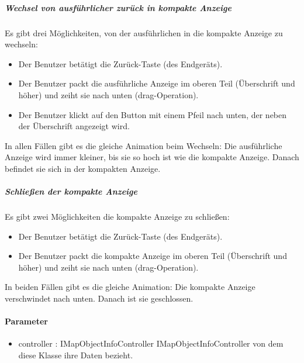 \subparagraph*{Wechsel von ausführlicher zurück in kompakte Anzeige}
Es gibt drei Möglichkeiten, von der ausführlichen in die kompakte Anzeige zu wechseln:
\begin{itemize}
    \item Der Benutzer betätigt die Zurück-Taste (des Endgeräts).
    \item Der Benutzer packt die ausführliche Anzeige im oberen Teil (Überschrift und höher) und zeiht sie nach unten (drag-Operation).
    \item Der Benutzer klickt auf den Button mit einem Pfeil nach unten, der neben der Überschrift angezeigt wird.
\end{itemize}
In allen Fällen gibt es die gleiche Animation beim Wechseln: Die ausführliche Anzeige wird immer 
kleiner, bis sie so hoch ist wie die kompakte Anzeige. Danach befindet sie sich in der kompakten Anzeige.

\subparagraph*{Schließen der kompakte Anzeige}
Es gibt zwei Möglichkeiten die kompakte Anzeige zu schließen:
\begin{itemize}
    \item Der Benutzer betätigt die Zurück-Taste (des Endgeräts).
    \item Der Benutzer packt die kompakte Anzeige im oberen Teil (Überschrift und höher) und zeiht sie nach unten (drag-Operation). 
\end{itemize}
In beiden Fällen gibt es die gleiche Animation: Die kompakte Anzeige verschwindet nach unten. Danach ist sie geschlossen.

\paragraph*{Parameter}
\begin{itemize}
    \item controller : IMapObjectInfoController IMapObjectInfoController von dem diese Klasse ihre Daten bezieht.
\end{itemize}
